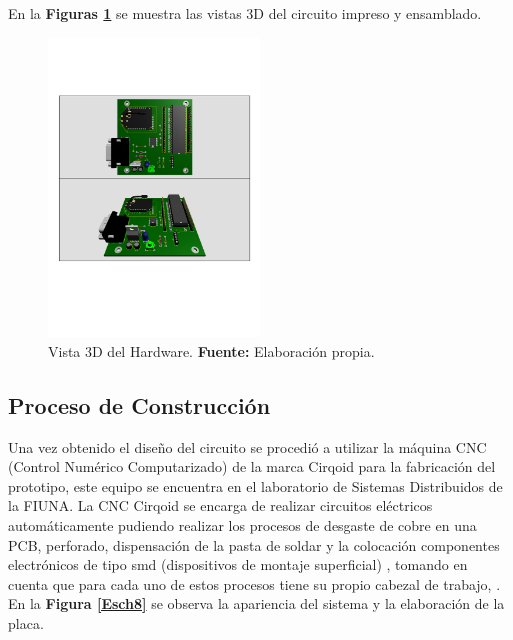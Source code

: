 




En la \textbf{Figuras \ref{Esch7} } se muestra las vistas 3D del circuito impreso y ensamblado. 

\begin{figure}[H]
	\centering
		\includegraphics[trim = 10mm 60mm 5mm 50mm, clip, width=0.5\textwidth]{./Cap4imagen/3d_can_4.pdf}
	\caption[Vista 3D del Hardware.]{Vista 3D del Hardware.\textbf{ Fuente:} Elaboración propia.}
	\label{Esch7} %
\end{figure}









\subsection{Proceso de Construcción}

Una vez obtenido el diseño del circuito se procedió a utilizar la máquina CNC (Control Numérico Computarizado)  de la marca Cirqoid para la fabricación del prototipo, este equipo se encuentra en el laboratorio de Sistemas Distribuidos de la FIUNA. La CNC Cirqoid  se encarga de realizar circuitos eléctricos automáticamente  pudiendo realizar los procesos de desgaste de cobre en una PCB, perforado, dispensación de la pasta de soldar y la colocación componentes electrónicos de tipo smd (dispositivos de montaje superficial) , tomando en cuenta que para cada uno de estos procesos tiene su propio cabezal de trabajo, \cite{cirq}. En la \textbf{Figura \ref{Esch8}} se observa la apariencia del sistema y la elaboración de la placa. 


